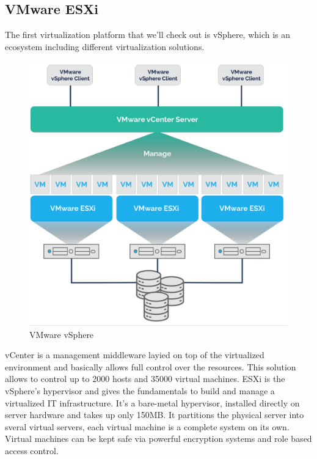 \subsection{VMware ESXi}
The first virtualization platform that we'll check out is vSphere, which is an ecosystem including different virtualization solutions.
\begin{figure}
    \centering
    \includegraphics[scale=0.4]{Images/ESXi.png}
    \caption{VMware vSphere}
\end{figure}
vCenter is a management middleware layied on top of the virtualized environment and basically allows full control over the resources. This solution allows to control up to 2000 hosts and 35000 virtual machines. \n
ESXi is the vSphere's hypervisor and gives the fundamentals to build and manage a virtualized IT infrastructure. It's a bare-metal hypervisor, installed directly on server hardware and takes up only 150MB. It partitions the physical server into sveral virtual servers, each virtual machine is a complete system on its own. \n
Virtual machines can be kept safe via powerful encryption systems and role based access control.
